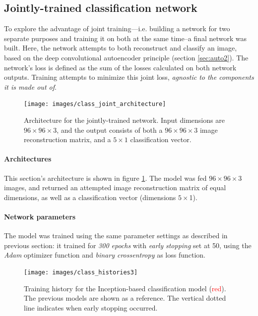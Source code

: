 
\subsection{Jointly-trained classification network}

To explore the advantage of joint training---i.e. building a network for two separate purposes and training it on both at the same time--a final network was built. Here, the network attempts to both reconstruct and classify an image, based on the deep convolutional autoencoder principle (section \textcolor{blue}{\ref{sec:auto2}}). The network's loss is defined as the sum of the losses calculated on both network outputs. Training attempts to minimize this joint loss, \textit{agnostic to the components it is made out of}.


\begin{figure}[!htbp]
	\begin{center}
		\texttt{[image: images/class\_joint\_architecture]}
		\caption{Architecture for the jointly-trained network. Input dimensions are $96\times 96\times3$, and the output consists of both a $96\times 96\times3$ image reconstruction matrix, and a $5\times1$ classification vector. }
		\label{fig:class_joint}
	\end{center}
\end{figure}

\paragraph{Architectures} 
This section's architecture is shown in figure \ref{fig:class_joint}. The model was fed $96\times 96\times3$ images, and returned an attempted image reconstruction matrix of equal dimensions, as well as a classification vector (dimensions $5 \times $1).


\paragraph{Network parameters} The model was trained using the same parameter settings as described in previous section: it trained for \textit{300 epochs} with \textit{early stopping} set at 50, using the \textit{Adam} optimizer function and \textit{binary crossentropy} as loss function.

\begin{figure}[!htbp]
	\begin{center}
		\texttt{[image: images/class\_histories3]}
		\caption{Training history for the Inception-based classification model (\textcolor{red}{red}). The previous models are shown as a reference. The vertical dotted line indicates when early stopping occurred.}
		\label{fig:class_histories3}
	\end{center}
\end{figure}

